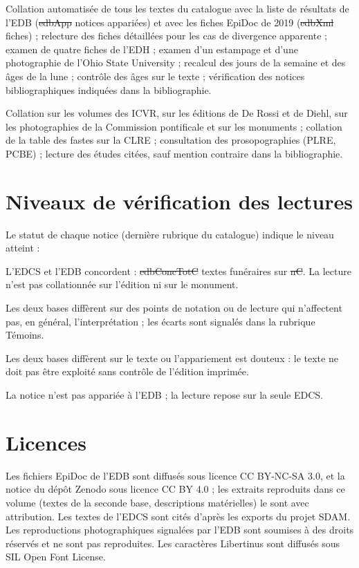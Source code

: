 \begin{description}[style=nextline,leftmargin=1.5em,font=\normalfont\scshape]
\item[Effectués] Collation automatisée de tous les textes du catalogue avec la liste de résultats de l’EDB (\st{edbApp} notices appariées) et avec les fiches EpiDoc de 2019 (\st{edbXml} fiches) ; relecture des fiches détaillées pour les cas de divergence apparente ; examen de quatre fiches de l’EDH ; examen d’un estampage et d’une photographie de l’Ohio State University ; recalcul des jours de la semaine et des âges de la lune ; contrôle des âges sur le texte ; vérification des notices bibliographiques indiquées dans la bibliographie.
\item[Non effectués] Collation sur les volumes des ICVR, sur les éditions de De Rossi et de Diehl, sur les photographies de la Commission pontificale et sur les monuments ; collation de la table des fastes sur la CLRE ; consultation des prosopographies (PLRE, PCBE) ; lecture des études citées, sauf mention contraire dans la bibliographie.
\end{description}

\section{Niveaux de vérification des lectures}

Le statut de chaque notice (dernière rubrique du catalogue) indique le niveau atteint :

\begin{description}[style=nextline,leftmargin=1.5em,font=\normalfont\scshape]
\item[Lecture stabilisée] L’EDCS et l’EDB concordent : \st{edbConcTotC} textes funéraires sur \st{nC}. La lecture n’est pas collationnée sur l’édition ni sur le monument.
\item[Écarts mineurs] Les deux bases diffèrent sur des points de notation ou de lecture qui n’affectent pas, en général, l’interprétation ; les écarts sont signalés dans la rubrique Témoins.
\item[Divergence forte] Les deux bases diffèrent sur le texte ou l’appariement est douteux : le texte ne doit pas être exploité sans contrôle de l’édition imprimée.
\item[Témoin unique] La notice n’est pas appariée à l’EDB ; la lecture repose sur la seule EDCS.
\end{description}

\section{Licences}

Les fichiers EpiDoc de l’EDB sont diffusés sous licence CC BY-NC-SA 3.0, et la notice du dépôt Zenodo sous licence CC BY 4.0 ; les extraits reproduits dans ce volume (textes de la seconde base, descriptions matérielles) le sont avec attribution. Les textes de l’EDCS sont cités d’après les exports du projet SDAM. Les reproductions photographiques signalées par l’EDB sont soumises à des droits réservés et ne sont pas reproduites. Les caractères Libertinus sont diffusés sous SIL Open Font License.
